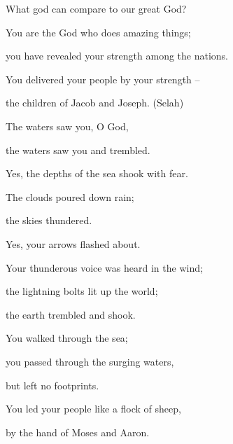 {\par }{\Q What
god
can compare
to our great
God?
\par }{\Q {}You
are the God
who does
amazing
things;
\par }{\Q you have revealed
your strength
among the nations.
\par }{\Q {}You delivered
your people
by your strength –
\par }{\Q the children
of Jacob
and Joseph.
(Selah)
\par }{\Q {}The waters
saw
you, O God,
\par }{\Q the waters
saw
you and trembled.
\par }{\Q Yes,
the depths
of the sea shook with fear.
\par }{\Q {}The clouds
poured down
rain;
\par }{\Q the skies
thundered.
\par }{\Q Yes,
your arrows
flashed about.
\par }{\Q {}Your thunderous
voice
was heard in the wind;
\par }{\Q the lightning bolts
lit
up the world;
\par }{\Q the earth
trembled
and shook.
\par }{\Q {}You walked through
the sea;
\par }{\Q you passed through
the surging
waters,
\par }{\Q but left no
footprints.
\par }{\Q {}You led
your people
like a flock
of sheep,
\par }{\Q by the hand
of Moses
and Aaron.


}
